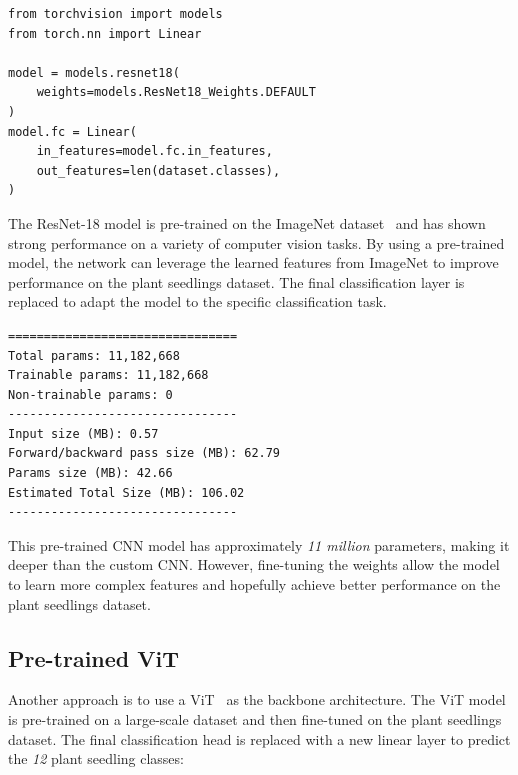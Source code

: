 \begin{minipage}{0.9\linewidth}\begin{lstlisting}[caption={Replacing the final classification layer of a pre-trained ResNet-18 model.},label={lst:pre-trained-cnn}]
from torchvision import models
from torch.nn import Linear

model = models.resnet18(
    weights=models.ResNet18_Weights.DEFAULT
)
model.fc = Linear(
    in_features=model.fc.in_features,
    out_features=len(dataset.classes),
)
\end{lstlisting}\end{minipage}

The ResNet-18 model is pre-trained on the ImageNet dataset~\cite{5206848ImageNet} and has shown strong performance on a variety of computer vision tasks. By using a pre-trained model, the network can leverage the learned features from ImageNet to improve performance on the plant seedlings dataset. The final classification layer is replaced to adapt the model to the specific classification task.

\begin{minipage}{0.9\linewidth}\begin{lstlisting}[language={},caption={Pre-trained CNN model summary.},label={lst:pre-trained-cnn-summary}]
================================
Total params: 11,182,668
Trainable params: 11,182,668
Non-trainable params: 0
--------------------------------
Input size (MB): 0.57
Forward/backward pass size (MB): 62.79
Params size (MB): 42.66
Estimated Total Size (MB): 106.02
--------------------------------
\end{lstlisting}\end{minipage}

This pre-trained CNN model has approximately \textit{11 million} parameters, making it deeper than the custom CNN. However, fine-tuning the weights allow the model to learn more complex features and hopefully achieve better performance on the plant seedlings dataset.

\subsection{Pre-trained ViT}

Another approach is to use a ViT~\cite{DBLP:journals/corr/abs-2010-11929} as the backbone architecture. The ViT model is pre-trained on a large-scale dataset and then fine-tuned on the plant seedlings dataset. The final classification head is replaced with a new linear layer to predict the \textit{12} plant seedling classes:

